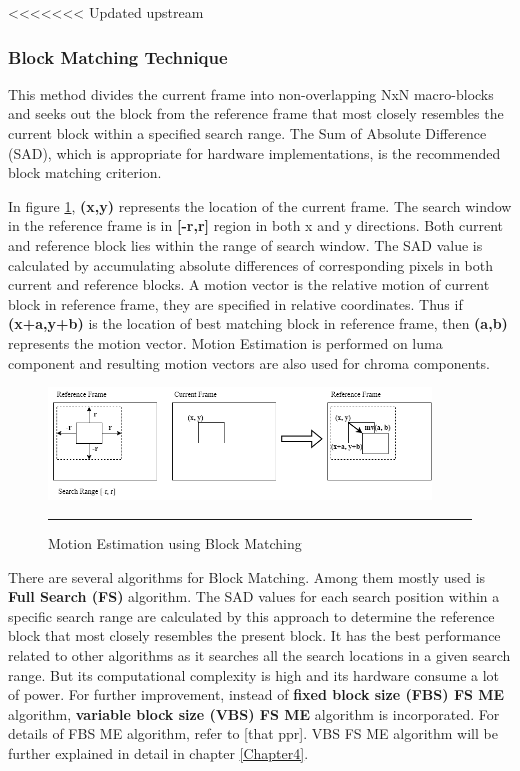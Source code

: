 <<<<<<< Updated upstream
\subsubsection{Block Matching Technique}
This method divides the current frame into non-overlapping NxN macro-blocks and seeks out the block from the reference frame that most closely resembles the current block within a specified search range. The Sum of Absolute Difference (SAD), which is appropriate for hardware implementations, is the recommended block matching criterion.

In figure \ref{fig:mv}, \textbf{(x,y)} represents the location of the current frame. The search window in the reference frame is in \textbf{[-r,r]} region in both x and y directions. Both current and reference block lies within the range of search window. The SAD value is calculated by accumulating absolute differences of corresponding pixels in both current and reference blocks. A motion vector is the relative motion of current block in reference frame, they are specified in relative coordinates. Thus if \textbf{(x+a,y+b)} is the location of best matching block in reference frame, then \textbf{(a,b)} represents the motion vector. Motion Estimation is performed on luma component and resulting motion vectors are also used for chroma components.

\begin{figure}[htbp]
	\centering
	\includegraphics[width = 4in]{./Figures/mv.png}
	\rule{35em}{0.5pt}
	\caption{Motion Estimation using Block Matching}
	\label{fig:mv}
\end{figure}

There are several algorithms for Block Matching. Among them mostly used is \textbf{Full Search (FS)} algorithm. The SAD values for each search position within a specific search range are calculated by this approach to determine the reference block that most closely resembles the present block. It has the best performance related to other algorithms as it searches all the search locations in a given search range. But its computational complexity is high and its hardware consume a lot of power. For further improvement, instead of \textbf{fixed block size (FBS) FS ME} algorithm, \textbf{variable block size (VBS) FS ME} algorithm is incorporated. For details of FBS ME algorithm, refer to [that ppr]. VBS FS ME algorithm will be further explained in detail in chapter \ref{Chapter4}.

